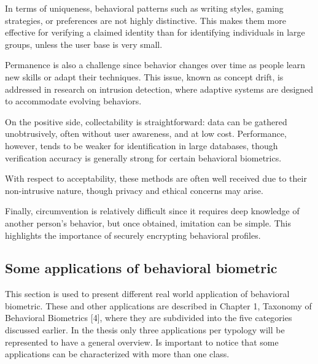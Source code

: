 \documentclass{article}
\begin{document}
In terms of uniqueness, behavioral patterns such as writing styles, gaming strategies, or preferences are not highly distinctive.
This makes them more effective for verifying a claimed identity than for identifying individuals in large groups, unless the user base is very small.

Permanence is also a challenge since behavior changes over time as people learn new skills or adapt their techniques.
This issue, known as concept drift, is addressed in research on intrusion detection, where adaptive systems are designed to accommodate evolving behaviors.

On the positive side, collectability is straightforward: data can be gathered unobtrusively, often without user awareness, and at low cost. 
Performance, however, tends to be weaker for identification in large databases, though verification accuracy is generally strong for certain behavioral biometrics.

With respect to acceptability, these methods are often well received due to their non-intrusive nature, though privacy and ethical concerns may arise. 

Finally, circumvention is relatively difficult since it requires deep knowledge of another person's behavior, but once obtained, imitation can be simple.
This highlights the importance of securely encrypting behavioral profiles.

\subsection{Some applications of behavioral biometric}

This section is used to present different real world application of behavioral biometric.
These and other applications are described in Chapter 1, Taxonomy of Behavioral Biometrics [4], where they are subdivided into the five categories discussed earlier.
In the thesis only three applications per typology will be represented to have a general overview. 
Is important to notice that some applications can be characterized with more than one class.
\end{document}
